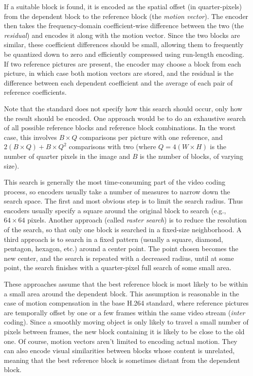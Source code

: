\documentclass{sig-alternate-05-2015}
\begin{document}
If a suitable block is found, it is encoded as the spatial offset (in
quarter-pixels) from the dependent block to the reference block (the {\it motion
vector}). The encoder then takes the frequency-domain coefficient-wise
difference between the two (the {\it residual}) and encodes it along with the
motion vector. Since the two blocks are similar, these coefficient differences
should be small, allowing them to frequently be quantized down to zero and
efficiently compressed using run-length encoding. If two reference pictures are
present, the encoder may choose a block from each picture, in which case both
motion vectors are stored, and the residual is the difference between each
dependent coefficient and the average of each pair of reference coefficients.

Note that the standard does not specify how this search should occur, only how
the result should be encoded. One approach would be to do an exhaustive search
of all possible reference blocks and reference block combinations. In the worst
case, this involves $B \times Q$ comparisons per picture with one reference, and
$2(B \times Q) + B \times Q^2$ comparisons with two (where $Q = 4(W\times H)$ is
the number of quarter pixels in the image and $B$ is the number of blocks, of
varying size).

This search is generally the most time-consuming part of the video coding
process, so encoders usually take a number of measures to narrow down the search
space. The first and most obvious step is to limit the search radius. Thus
encoders usually specify a square around the original block to search (e.g.,
$64\times 64$ pixels. Another approach (called {\it raster search}) is to reduce
the resolution of the search, so that only one block is searched in a fixed-size
neighborhood. A third approach is to search in a fixed pattern (usually a
square, diamond, pentagon, hexagon, etc.) around a center point. The point
chosen becomes the new center, and the search is repeated with a decreased
radius, until at some point, the search finishes with a quarter-pixel full
search of some small area.

These approaches assume that the best reference block is most likely to be
within a small area around the dependent block. This assumption is reasonable
in the case of motion compensation in the base H.264 standard, where reference
pictures are temporally offset by one or a few frames within the same video
stream ({\it inter} coding). Since a smoothly moving object is only likely to
travel a small number of pixels between frames, the new block containing it is
likely to be close to the old one. Of course, motion vectors aren't limited to
encoding actual motion. They can also encode visual similarities between blocks
whose content is unrelated, meaning that the best reference block is sometimes
distant from the dependent block.
\end{document}
